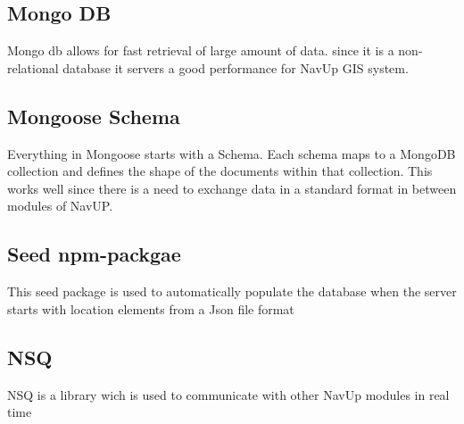 \documentclass{article}
\begin{document}
	\subsection{Mongo DB}
		Mongo db allows for fast retrieval of large amount of data. since it is a non-relational database it servers a good 				performance for NavUp GIS system.
	\subsection{Mongoose Schema}
		Everything in Mongoose starts with a Schema. Each schema maps to a MongoDB collection and defines the shape of the 		documents within that collection. 
		This works well since there is a need to exchange data in a standard format in between modules of NavUP.
	\subsection{Seed npm-packgae}
		This seed package is used to automatically populate the database when the server starts with location elements from a Json file format
	\subsection{NSQ}
		NSQ is a library wich is used to communicate with other NavUp modules in real time
\end{document}
